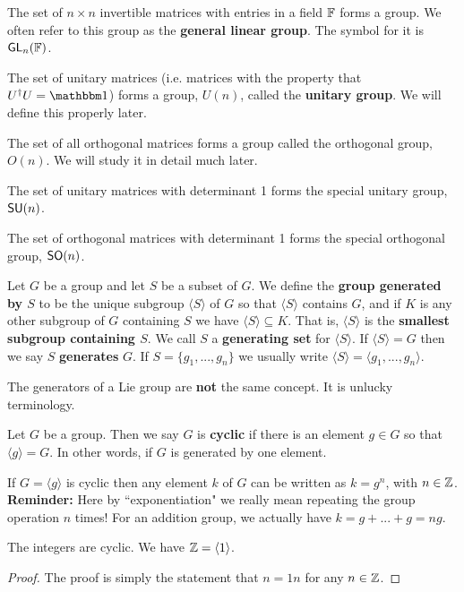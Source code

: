 \begin{example}
    The set of $n\times n$ invertible matrices with entries in a field $\operatorname{\mathbb{F}}$ forms a group. We often refer to this group as the \textbf{general linear group}. The symbol for it is $\operatorname{\textsf{GL}}_n(\operatorname{\mathbb{F}})$.
\end{example}
\begin{example}
    The set of unitary matrices (i.e. matrices with the property that $U^\dagger U=\One$) forms a group, $U(n)$, called the \textbf{unitary group}. We will define this properly later.
\end{example}
\begin{example}
    The set of all orthogonal matrices forms a group called the orthogonal group, $O(n)$. We will study it in detail much later.
\end{example}
\begin{example}
    The set of unitary matrices with determinant 1 forms the special unitary group, $\operatorname{\textsf{SU}}(n)$.

    The set of orthogonal matrices with determinant 1 forms the special orthogonal group, $\operatorname{\textsf{SO}}(n)$.
\end{example}

\begin{defn} Let $G$ be a group and let $S$ be a subset of $G$. We define the \textbf{group generated by $S$} to be the unique subgroup $\langle S\rangle$ of $G$ so that $\langle S\rangle$ contains $G$, and if $K$ is any other subgroup of $G$ containing $S$ we have $\langle S\rangle\subseteq K$. That is, $\langle S\rangle$ is the \textbf{smallest subgroup containing $S$}.
We call $S$ a \textbf{generating set} for $\langle S\rangle$. If $\langle S\rangle=G$ then we say $S$ \textbf{generates} $G$. If $S = \{g_1,...,g_n\}$ we usually write $\langle S\rangle = \langle g_1,...,g_n\rangle$.
\end{defn}
\begin{remark*}
    The generators of a Lie group are \textbf{not} the same concept. It is unlucky terminology.
\end{remark*}
\begin{defn}
 Let $G$ be a group. Then we say $G$ is \textbf{cyclic} if there is an element $g \in G$ so that $\langle g\rangle = G$. In other words, if $G$ is generated by one element.
\end{defn}
\begin{remark*}
    If $G=\langle g\rangle$ is cyclic then any element $k$ of $G$ can be written as $k = g^{n}$, with $n \in \operatorname{\mathbb{Z}}$. \textbf{Reminder:} Here by ``exponentiation" we really mean repeating the group operation $n$ times! For an addition group, we actually have $k = g+...+g = ng$.
\end{remark*}
\begin{lemma}
    The integers are cyclic. We have $\operatorname{\mathbb{Z}} = \langle 1 \rangle$.
\end{lemma}
\begin{proof}
    The proof is simply the statement that $n = 1n$ for any $n \in \operatorname{\mathbb{Z}}$.
\end{proof}


